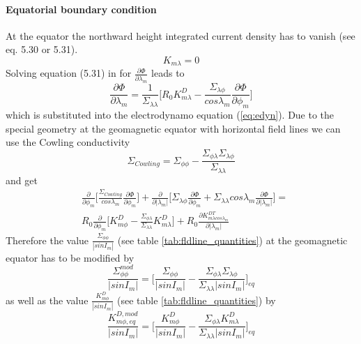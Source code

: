 \paragraph{Equatorial boundary condition}\label{fieldline_eq}
%
At the equator the northward height integrated current density 
has to vanish (see \cite{rich95} eq. 5.30
or 5.31).
%
\begin{equation}
  K_{m \lambda} = 0 \label{eq:kmlamequator}
\end{equation}
%
Solving equation (5.31) in \cite{rich95} for $\frac{\partial \Phi}{\partial \lambda_m}$
leads to
%
\begin{equation}
  \frac{\partial \Phi}{\partial \lambda_m} = \frac{1}{\Sigma_{\lambda \lambda}} \bigl[
  R_0 K_{m \lambda}^D - \frac{\Sigma_{\lambda \phi}}{cos
  \lambda_m}\frac{\partial \Phi}{\partial \phi_m}
  \bigr]
\end{equation}
%
which is substituted into the electrodynamo equation (\ref{eq:edyn}). Due to the
special geometry at the geomagnetic equator with horizontal field lines we can
use the Cowling conductivity
%
\begin{equation}
  \Sigma_{Cowling} = \Sigma_{\phi \phi} - \frac{\Sigma_{\phi \lambda} 
              \Sigma_{\lambda \phi}}{\Sigma_{\lambda \lambda}}
\end{equation}
%
and get
%
\begin{equation}
 \begin{split}
  & \frac{\partial}{\partial \phi_m}\bigl[ \frac{\Sigma_{Cowling}}{cos \lambda_m}
       \frac{\partial \Phi}{\partial \phi_m} \bigr] +
   \frac{\partial}{\partial | \lambda_m |} \bigl[ \Sigma_{\lambda \phi}
    \frac{\partial \Phi}{\partial \phi_m} + 
   \Sigma_{\lambda \lambda} cos \lambda_m 
   \frac{\partial \Phi}{\partial |\lambda_m|} \bigr] = \\
      &  R_0 \frac{\partial}{\partial \phi_m} \bigl[K_{m \phi}^D -  \frac{\Sigma_{\phi \lambda} 
              }{\Sigma_{\lambda \lambda}} K_{m \lambda}^D \bigr] +  
   R_0 \frac{\partial K_{m \lambda cos \lambda_m }^{DT}}{\partial | \lambda_m |} \label{eq:eldyn_eq}
  \end{split}
\end{equation}
%
Therefore the value $\frac{\Sigma_{\phi \phi}}{|sin I_m|}$ (see table 
\ref{tab:fldline_quantities}) at the geomagnetic
equator has to be modified by
%
\begin{equation}
  \frac{\Sigma_{\phi \phi}^{mod}}{|sin I_m|} = \biggl[\frac{\Sigma_{\phi \phi}}{|sin
        I_m|} - \frac{\Sigma_{\phi \lambda}\Sigma_{\lambda \phi}}
	{\Sigma_{\lambda \lambda} |sin I_m|}\biggr]_{eq}
\end{equation}
%
as well as the value $\frac{K_{m \phi}^D}{|sinI_m|}$ (see table \ref{tab:fldline_quantities}) by
%
\begin{equation}
  \frac{K_{m \phi, eq}^{D, mod}}{|sinI_m|} =\biggl[ \frac{K_{m \phi}^D}{|sinI_m|} -
       \frac{\Sigma_{\phi \lambda} K_{m \lambda}^D}
	{\Sigma_{\lambda \lambda} |sin I_m|} \biggr]_{eq} \label{eq:kqphi_mod}
\end{equation}
%
%
